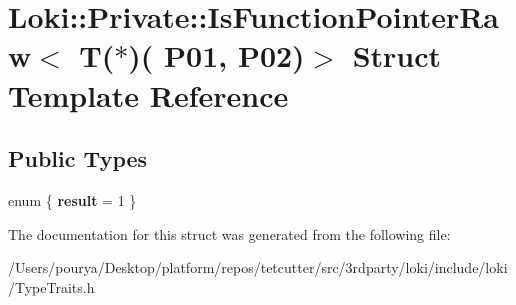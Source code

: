 \hypertarget{structLoki_1_1Private_1_1IsFunctionPointerRaw_3_01T_07_5_08_07_01_01_01_01_01_01_01_01_01_01_01_f81ff44edad98ce1c540294fc1302899}{}\section{Loki\+:\+:Private\+:\+:Is\+Function\+Pointer\+Raw$<$ T($\ast$)( P01, P02)$>$ Struct Template Reference}
\label{structLoki_1_1Private_1_1IsFunctionPointerRaw_3_01T_07_5_08_07_01_01_01_01_01_01_01_01_01_01_01_f81ff44edad98ce1c540294fc1302899}
\subsection*{Public Types}
\begin{DoxyCompactItemize}
\item 
\hypertarget{structLoki_1_1Private_1_1IsFunctionPointerRaw_3_01T_07_5_08_07_01_01_01_01_01_01_01_01_01_01_01_f81ff44edad98ce1c540294fc1302899_ae4b6ef84f67eaddad9ae5937726fb0c9}{}enum \{ {\bfseries result} = 1
 \}\label{structLoki_1_1Private_1_1IsFunctionPointerRaw_3_01T_07_5_08_07_01_01_01_01_01_01_01_01_01_01_01_f81ff44edad98ce1c540294fc1302899_ae4b6ef84f67eaddad9ae5937726fb0c9}

\end{DoxyCompactItemize}


The documentation for this struct was generated from the following file\+:\begin{DoxyCompactItemize}
\item 
/\+Users/pourya/\+Desktop/platform/repos/tetcutter/src/3rdparty/loki/include/loki/Type\+Traits.\+h\end{DoxyCompactItemize}
